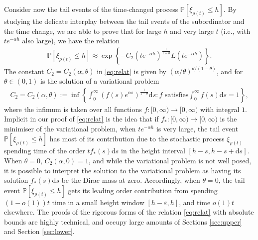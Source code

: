 \documentclass[a4,12pt]{amsart}
\numberwithin{equation}{section}
\begin{document}
Consider now the tail events of the time-changed process $\mathbb{P}[ \xi_{\rho(t)} \leq h ]$. By studying the delicate interplay between the tail events of the subordinator and the time change, we are able to prove that for large $h$ and very large $t$ (i.e., with $te^{- \alpha h}$ also large), we have the relation
\begin{align} \label{eq:relat}
\mathbb{P} \left[ \xi_{\rho(t)} \leq h \right] \approx  \exp \left\{ - C_2 (t e^{ - \alpha h} )^{\frac{1}{1-\theta}} L(t e^{ - \alpha h} ) \right\}.
\end{align} 
The constant $C_2 = C_2(\alpha,\theta)$ in \eqref{eq:relat} is given by $(\alpha/\theta)^{\theta/(1-\theta)}$, and for $\theta \in (0,1)$ is the solution of a variational problem
\begin{align*}
C_2 = C_2(\alpha,\theta) := \inf \left\{ \int_0^\infty \left(f(s) e^{ \alpha s} \right)^{\frac{1}{1-\theta}} \mathrm{d}s : f \text{ satisfies} \int_0^\infty f(s) \mathrm{d}s = 1 \right\},
\end{align*}
where the infimum is taken over all functions $f:[0,\infty) \to [0,\infty)$ with integral $1$. Implicit in our proof of \eqref{eq:relat} is the idea that if $f_*:[0,\infty) \to [0,\infty)$ is the minimiser of the variational problem, when $te^{-\alpha h}$ is very large, the tail event $\mathbb{P}[ \xi_{\rho(t)} \leq h]$ has most of its contribution due to the stochastic process $\xi_{\rho(t)}$ spending time of the order $t f_*(s) \mathrm{d}s$ in the height interval $[h-s,h-s+\mathrm{d}s]$. When $\theta = 0$, $C_2(\alpha,0) = 1$, and while the variational problem is not well posed, it is possible to interpret the solution to the variational problem as having its solution $f_*(s)\mathrm{d}s$ be the Dirac mass at zero. Accordingly, when $\theta = 0$, the tail event $\mathbb{P}[ \xi_{\rho(t)} \leq h]$ gets its leading order contribution from spending $(1-o(1))t$ time in a small height window $[h-\varepsilon,h]$, and time $o(1)t$ elsewhere. 
The proofs of the rigorous forms of the relation \eqref{eq:relat} with absolute bounds are highly technical, and occupy large amounts of Sections \ref{sec:upper} and Section \ref{sec:lower}. 
\end{document}
